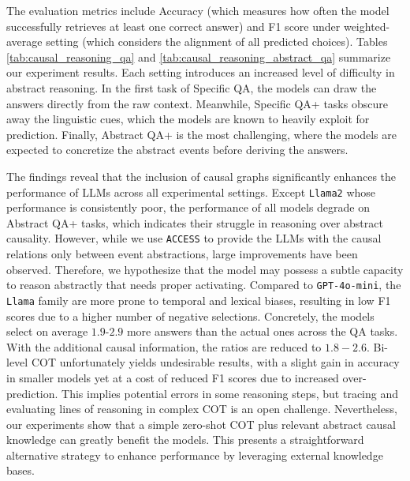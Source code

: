 The evaluation metrics include Accuracy (which measures how often the model successfully retrieves at least one correct answer) and F1 score under weighted-average setting (which considers the alignment of all predicted choices). 
Tables \ref{tab:causal_reasoning_qa} and \ref{tab:causal_reasoning_abstract_qa} summarize our experiment results. Each setting introduces an increased level of difficulty in abstract reasoning. In the first task of Specific QA, the models can draw the answers directly from the raw context. Meanwhile, Specific QA+ tasks obscure away the linguistic cues, which the models are known to heavily exploit for prediction. Finally, Abstract QA+ is the most challenging, where the models are expected to concretize the abstract events before deriving the answers.  

The findings reveal that the inclusion of causal graphs significantly enhances the performance of LLMs across all experimental settings. Except \texttt{Llama2} whose performance is consistently poor, the performance of all models degrade on Abstract QA+ tasks, which indicates their struggle in reasoning over abstract causality. However, while we use \texttt{ACCESS} to provide the LLMs with the causal relations only between event abstractions, large improvements have been observed. Therefore, we hypothesize that the model may possess a subtle capacity to reason abstractly that needs proper activating. Compared to \texttt{GPT-4o-mini}, the \texttt{Llama} family are more prone to temporal and lexical biases, resulting in low F1 scores due to a higher number of negative selections. Concretely, the models select on average $1.9$-$2.9$ more answers than the actual ones across the QA tasks. With the additional causal information, the ratios are reduced to $1.8-2.6$. Bi-level COT unfortunately yields undesirable results, with a slight gain in accuracy in smaller models yet at a cost of reduced F1 scores due to increased over-prediction. This implies potential errors in some reasoning steps, but tracing and evaluating lines of reasoning in complex COT is an open challenge. Nevertheless, our experiments show that a simple zero-shot COT plus relevant abstract causal knowledge can greatly benefit the models. This presents a straightforward alternative strategy to enhance performance by leveraging external knowledge bases.








